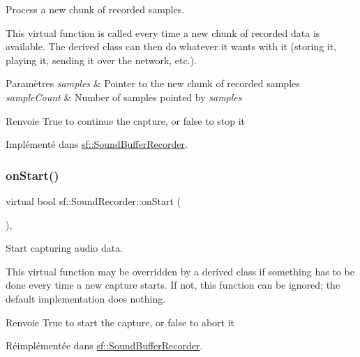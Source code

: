 Process a new chunk of recorded samples. 

This virtual function is called every time a new chunk of recorded data is available. The derived class can then do whatever it wants with it (storing it, playing it, sending it over the network, etc.).


\begin{DoxyParams}{Paramètres}
{\em samples} & Pointer to the new chunk of recorded samples \\
\hline
{\em sample\+Count} & Number of samples pointed by {\itshape samples} \\
\hline
\end{DoxyParams}
\begin{DoxyReturn}{Renvoie}
True to continue the capture, or false to stop it 
\end{DoxyReturn}


Implémenté dans \hyperlink{classsf_1_1SoundBufferRecorder_a9ceb94de14632ae8c1b78faf603b4767}{sf\+::\+Sound\+Buffer\+Recorder}.

\mbox{\label{classsf_1_1SoundRecorder_a7af418fb036201d3f85745bef78ce77f}} 
\subsubsection{\texorpdfstring{on\+Start()}{onStart()}}
{\footnotesize\ttfamily virtual bool sf\+::\+Sound\+Recorder\+::on\+Start (\begin{DoxyParamCaption}{ }\end{DoxyParamCaption})\hspace{0.3cm}{\ttfamily [protected]}, {\ttfamily [virtual]}}



Start capturing audio data. 

This virtual function may be overridden by a derived class if something has to be done every time a new capture starts. If not, this function can be ignored; the default implementation does nothing.

\begin{DoxyReturn}{Renvoie}
True to start the capture, or false to abort it 
\end{DoxyReturn}


Réimplémentée dans \hyperlink{classsf_1_1SoundBufferRecorder_a531a7445fc8a48eaf9fc039c83f17c6f}{sf\+::\+Sound\+Buffer\+Recorder}.

